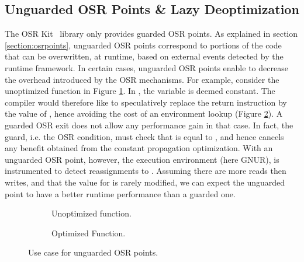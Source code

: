 \subsection{Unguarded OSR Points \& Lazy Deoptimization}

The OSR Kit~\cite{OSRKit} library only provides guarded OSR points.
As explained in section \ref{section:osrpoints}, unguarded OSR points correspond to portions of the code that can be overwritten, at runtime, based on external events detected by the runtime framework.
In certain cases, unguarded OSR points enable to decrease the overhead introduced by the OSR mechanisms. 
For example, consider the unoptimized function in Figure \ref{fig:lazydeoptnorm}. 
In , the variable  is deemed constant. 
The compiler would therefore like to speculatively replace the return instruction by the value of , hence avoiding the cost of an environment lookup (Figure \ref{fig:lazydeoptopt}).
A guarded OSR exit does not allow any performance gain in that case.
In fact, the guard, i.e. the OSR condition, must check that  is equal to , and hence cancels any benefit obtained from the constant propagation optimization.
With an unguarded OSR point, however, the execution environment (here GNUR), is instrumented to detect reassignments to .
Assuming there are more reads then writes, and that the value for  is rarely modified, we can expect the unguarded point to have a better runtime performance than a guarded one.\\

\begin{figure}[h]
    \centering
    \begin{subfigure}{.49\textwidth}
        \caption{Unoptimized function.}
        \label{fig:lazydeoptnorm}
    \end{subfigure}
    \centering
    \begin{subfigure}{.49\textwidth}
        \caption{Optimized Function.}
        \label{fig:lazydeoptopt}   
    \end{subfigure}
    \caption{Use case for unguarded OSR points.}
    \label{fig:unguardedosrpointexample}
\end{figure}

